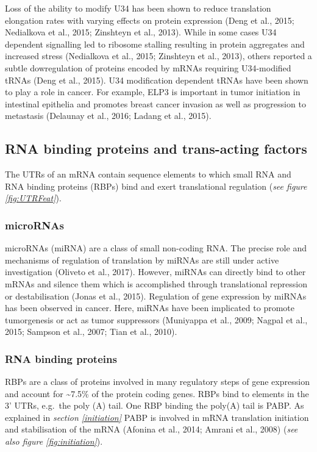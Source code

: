 \documentclass[12pt,openany]{book}
\begin{document}
Loss of the ability to modify U34 has been shown to reduce translation
elongation rates with varying effects on protein expression (Deng et
al., 2015; Nedialkova et al., 2015; Zinshteyn et al., 2013). While in
some cases U34 dependent signalling led to ribosome stalling resulting
in protein aggregates and increased stress (Nedialkova et al., 2015;
Zinshteyn et al., 2013), others reported a subtle dowregulation of
proteins encoded by mRNAs requiring U34-modified tRNAs (Deng et al.,
2015). U34 modification dependent tRNAs have been shown to play a role
in cancer. For example, ELP3 is important in tumor initiation in
intestinal epithelia and promotes breast cancer invasion as well as
progression to metastasis (Delaunay et al., 2016; Ladang et al., 2015).

\subsection{RNA binding proteins and trans-acting factors}

The UTRs of an mRNA contain sequence elements to which small RNA and RNA
binding proteins (RBPs) bind and exert translational regulation
(\emph{see figure \ref{fig:UTRFeat}}).

\subsubsection{microRNAs} microRNAs (miRNA) are a class of small
non-coding RNA. The precise role and mechanisms of regulation of
translation by miRNAs are still under active investigation (Oliveto et
al., 2017). However, miRNAs can directly bind to other mRNAs and silence
them which is accomplished through translational repression or
destabilisation (Jonas et al., 2015). Regulation of gene expression by
miRNAs has been observed in cancer. Here, miRNAs have been implicated to
promote tumorgenesis or act as tumor suppressors (Muniyappa et al.,
2009; Nagpal et al., 2015; Sampson et al., 2007; Tian et al., 2010).

\subsubsection{RNA binding proteins}

RBPs are a class of proteins involved in many regulatory steps of gene
expression and account for \textasciitilde{}7.5\% of the protein coding
genes. RBPs bind to elements in the 3' UTRs, e.g.~the poly (A) tail. One
RBP binding the poly(A) tail is PABP. As explained in \emph{section
\ref{initiation}} PABP is involved in mRNA translation initiation and
stabilisation of the mRNA (Afonina et al., 2014; Amrani et al., 2008)
(\emph{see also figure \ref{fig:initiation}}).
\end{document}
